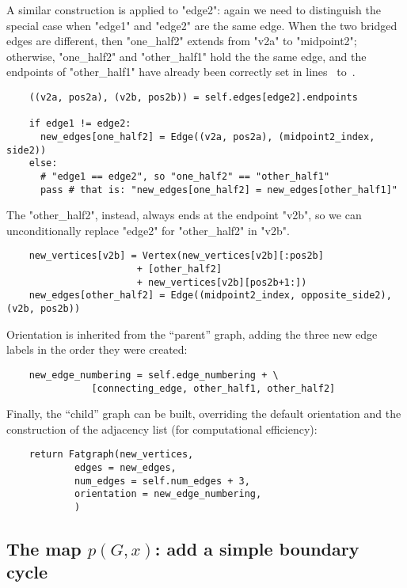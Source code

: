 A similar construction is applied to "edge2": again we need to distinguish the special case when
"edge1" and "edge2" are the same edge.  When the two bridged edges are
different, then "one_half2" extends from
"v2a" to "midpoint2"; otherwise, "one_half2" and "other_half1" hold
the the same edge, and the endpoints of "other_half1" have already
been correctly set in lines~ to~.
\begin{lstlisting}
    ((v2a, pos2a), (v2b, pos2b)) = self.edges[edge2].endpoints

    if edge1 != edge2:
      new_edges[one_half2] = Edge((v2a, pos2a), (midpoint2_index, side2))
    else:
      # "edge1 == edge2", so "one_half2" == "other_half1"
      pass # that is: "new_edges[one_half2] = new_edges[other_half1]"
\end{lstlisting}
The "other_half2", instead, always ends at the endpoint "v2b", so we
can unconditionally replace "edge2" for "other_half2" in "v2b".
\begin{lstlisting}
    new_vertices[v2b] = Vertex(new_vertices[v2b][:pos2b]
                       + [other_half2]
                       + new_vertices[v2b][pos2b+1:])
    new_edges[other_half2] = Edge((midpoint2_index, opposite_side2), (v2b, pos2b))

\end{lstlisting}

Orientation is inherited from the ``parent'' graph, adding the three
new edge labels in the order they were created:
\begin{lstlisting}
    new_edge_numbering = self.edge_numbering + \
               [connecting_edge, other_half1, other_half2]

\end{lstlisting}
Finally, the ``child'' graph can be built, overriding the default
orientation and the construction of the adjacency list (for
computational efficiency):
\begin{lstlisting}
    return Fatgraph(new_vertices,
            edges = new_edges,
            num_edges = self.num_edges + 3,
            orientation = new_edge_numbering,
            )

\end{lstlisting}


\subsection{The map $p(G,x)$: add a simple boundary cycle}
\label{sec:hangcircle}

